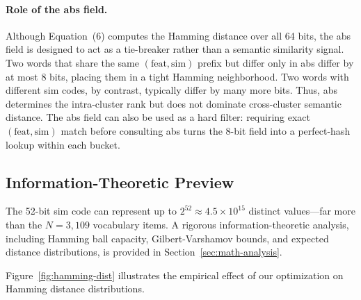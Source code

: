 \documentclass[11pt,a4paper]{article}
\begin{document}
\paragraph{Role of the abs field.} Although Equation~(6) computes the Hamming distance over all 64 bits, the abs field is designed to act as a tie-breaker rather than a semantic similarity signal. Two words that share the same $(\text{feat}, \text{sim})$ prefix but differ only in abs differ by at most 8 bits, placing them in a tight Hamming neighborhood. Two words with different sim codes, by contrast, typically differ by many more bits. Thus, abs determines the intra-cluster rank but does not dominate cross-cluster semantic distance. The abs field can also be used as a hard filter: requiring exact $(\text{feat}, \text{sim})$ match before consulting abs turns the 8-bit field into a perfect-hash lookup within each bucket.

\subsection{Information-Theoretic Preview}

The 52-bit sim code can represent up to $2^{52} \approx 4.5 \times 10^{15}$ distinct values---far more than the $N=3{,}109$ vocabulary items. A rigorous information-theoretic analysis, including Hamming ball capacity, Gilbert-Varshamov bounds, and expected distance distributions, is provided in Section~\ref{sec:math-analysis}.

Figure~\ref{fig:hamming-dist} illustrates the empirical effect of our optimization on Hamming distance distributions.
\end{document}

